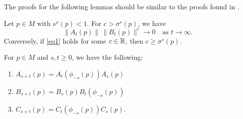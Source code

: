 The proofs for the following lemmas should be similar to the proofs found in \cite{dieci1997lyapunov}.
\begin{lem}\label{lemma1}
	Let \(p \in M\) with \(\nu^s(p) < 1\). For \(c > \sigma^s(p)\), we have 
	\begin{equation}\label{eq1}
		\| A_t(p) \|\, \|B_t(p) \|^c \to 0 \quad \text{as } t\to\infty.
	\end{equation}
	Conversely, if \cref{eq1} holds for some \(c\in \mathbb{R}\), then \(c\geq \sigma^s(p).\)
\end{lem}
\begin{lem}\label{lemma2}
	For \(p\in M\) and \(s,t\geq 0\), we have the following:
	\begin{enumerate}[label=(\roman*)]
		\item \(A_{s+t}(p) = A_t(\phi_{-s}(p)) A_s(p)\) 
		\item \(B_{s+t}(p) = B_s(p) B_t(\phi_{-s}(p))\)
		\item \(C_{s+t}(p) = C_t(\phi_{-s}(p))C_s(p)\).
	\end{enumerate}
\end{lem}

